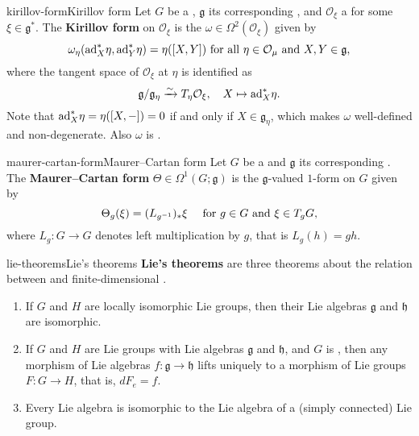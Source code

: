 \begin{topic}{kirillov-form}{Kirillov form}
    Let $G$ be a , $\mathfrak{g}$ its corresponding , and $\mathcal{O}_\xi$ a  for some $\xi \in \mathfrak{g}^*$. The \textbf{Kirillov form} on $\mathcal{O}_\xi$ is the  $\omega \in \Omega^2(\mathcal{O}_\xi)$ given by
    \[ \omega_\eta(\textup{ad}_X^* \eta, \textup{ad}_Y^* \eta) = \eta([X, Y]) \textup{ for all } \eta \in \mathcal{O}_\mu \textup{ and } X, Y \in \mathfrak{g} , \]
    where the tangent space of $\mathcal{O}_\xi$ at $\eta$ is identified as
    \[ \mathfrak{g}/\mathfrak{g}_\eta \xrightarrow{\sim} T_\eta \mathcal{O}_\xi, \quad X \mapsto \textup{ad}_X^* \eta . \]
    Note that $\textup{ad}_X^* \eta = \eta([X, -]) = 0$ if and only if $X \in \mathfrak{g}_\eta$, which makes $\omega$ well-defined and non-degenerate. Also $\omega$ is .
\end{topic}

\begin{topic}{maurer-cartan-form}{Maurer--Cartan form}
    Let $G$ be a  and $\mathfrak{g}$ its corresponding . The \textbf{Maurer--Cartan form} $\Theta \in \Omega^1(G; \mathfrak{g})$ is the $\mathfrak{g}$-valued $1$-form on $G$ given by
    \[ \Theta_g(\xi) = (L_{g^{-1}})_* \xi \quad \textup{ for } g \in G \textup{ and } \xi \in T_g G, \]
    where $L_g : G \to G$ denotes left multiplication by $g$, that is $L_g(h) = gh$.
\end{topic}

\begin{topic}{lie-theorems}{Lie's theorems}
    \textbf{Lie's theorems} are three theorems about the relation between  and finite-dimensional .
    \begin{enumerate}[label=(\roman*)]
        \item If $G$ and $H$ are locally isomorphic Lie groups, then their Lie algebras $\mathfrak{g}$ and $\mathfrak{h}$ are isomorphic.
        \item If $G$ and $H$ are Lie groups with Lie algebras $\mathfrak{g}$ and $\mathfrak{h}$, and $G$ is , then any morphism of Lie algebras $f : \mathfrak{g} \to \mathfrak{h}$ lifts uniquely to a morphism of Lie groups $F : G \to H$, that is, $dF_e = f$.
        \item Every Lie algebra is isomorphic to the Lie algebra of a (simply connected) Lie group.
    \end{enumerate}
\end{topic}

